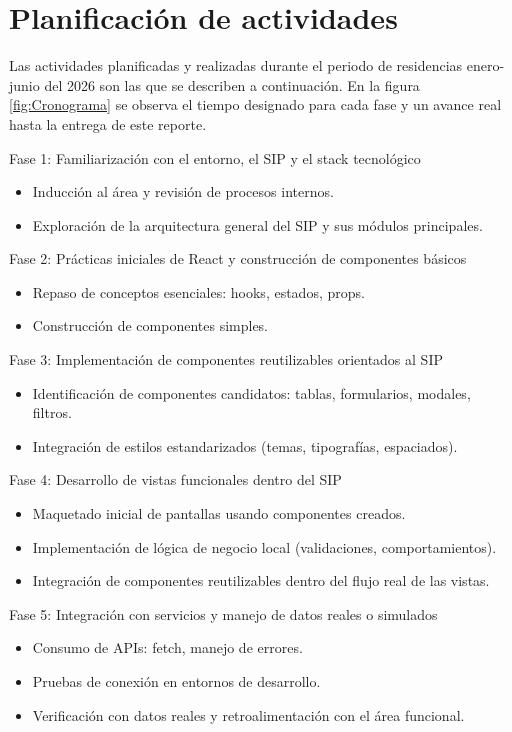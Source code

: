 \section{Planificación de actividades}

Las actividades planificadas y realizadas durante el periodo de residencias enero-junio del 2026 son las que se describen a continuación. En la figura \ref{fig:Cronograma} se observa el tiempo designado para cada fase y un avance real hasta la entrega de este reporte.

Fase 1: Familiarización con el entorno, el SIP y el stack tecnológico
\begin{itemize}
    \item Inducción al área y revisión de procesos internos.
    \item Exploración de la arquitectura general del SIP y sus módulos principales.
\end{itemize}

Fase 2: Prácticas iniciales de React y construcción de componentes básicos
\begin{itemize}
    \item Repaso de conceptos esenciales: hooks, estados, props.
    \item Construcción de componentes simples.
\end{itemize}

Fase 3: Implementación de componentes reutilizables orientados al SIP
\begin{itemize}
    \item Identificación de componentes candidatos: tablas, formularios, modales, filtros.
    \item Integración de estilos estandarizados (temas, tipografías, espaciados).
\end{itemize}

Fase 4: Desarrollo de vistas funcionales dentro del SIP
\begin{itemize}
    \item Maquetado inicial de pantallas usando componentes creados.
    \item Implementación de lógica de negocio local (validaciones, comportamientos).
    \item Integración de componentes reutilizables dentro del flujo real de las vistas.
\end{itemize}

Fase 5: Integración con servicios y manejo de datos reales o simulados
\begin{itemize}
    \item Consumo de APIs: fetch, manejo de errores.
    \item Pruebas de conexión en entornos de desarrollo.
    \item Verificación con datos reales y retroalimentación con el área funcional.
\end{itemize}

